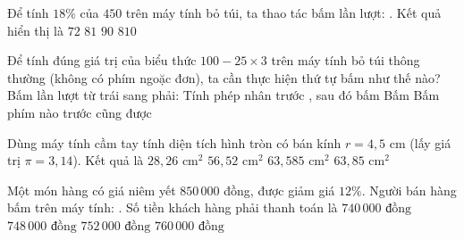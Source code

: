 \begin{ex} %
Để tính $18\%$ của $450$ trên máy tính bỏ túi, ta thao tác bấm lần lượt:    \fbox{$\times$}   \fbox{\%}. Kết quả hiển thị là
\choice
{$72$}
{\True $81$}
{$90$}
{$810$}
\end{ex}

\begin{ex} %
Để tính đúng giá trị của biểu thức $100 - 25 \times 3$ trên máy tính bỏ túi thông thường (không có phím ngoặc đơn), ta cần thực hiện thứ tự bấm như thế nào?
\choice
{Bấm lần lượt từ trái sang phải:  \fbox{--}  \fbox{$\times$}  \fbox{=}}
{\True Tính phép nhân trước  \fbox{$\times$}  \fbox{=}, sau đó bấm  \fbox{--}  \fbox{=}}
{Bấm  \fbox{$\times$}  \fbox{--}  \fbox{=}}
{Bấm phím nào trước cũng được}
\end{ex}

\begin{ex} %
Dùng máy tính cầm tay tính diện tích hình tròn có bán kính $r = 4{,}5\text{ cm}$ (lấy giá trị $\pi = 3{,}14$). Kết quả là
\choice
{$28{,}26\text{ cm}^2$}
{$56{,}52\text{ cm}^2$}
{\True $63{,}585\text{ cm}^2$}
{$63{,}85\text{ cm}^2$}
\end{ex}

\begin{ex} %
Một món hàng có giá niêm yết $850\,000$ đồng, được giảm giá $12\%$. Người bán hàng bấm trên máy tính:  \fbox{--}  \fbox{\%}. Số tiền khách hàng phải thanh toán là
\choice
{$740\,000\text{ đồng}$}
{\True $748\,000\text{ đồng}$}
{$752\,000\text{ đồng}$}
{$760\,000\text{ đồng}$}
\end{ex}


